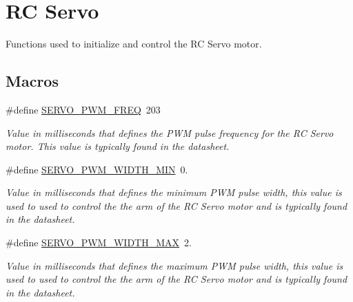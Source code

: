 \hypertarget{group__rc__servo}{\section{R\-C Servo}
\label{group__rc__servo}
}


Functions used to initialize and control the R\-C Servo motor.  


\subsection*{Macros}
\begin{DoxyCompactItemize}
\item 
\hypertarget{group__rc__servo_ga0eb250599505bd3600d26b6bad6a415f}{\#define \hyperlink{group__rc__servo_ga0eb250599505bd3600d26b6bad6a415f}{S\-E\-R\-V\-O\-\_\-\-P\-W\-M\-\_\-\-F\-R\-E\-Q}~203}\label{group__rc__servo_ga0eb250599505bd3600d26b6bad6a415f}

\begin{DoxyCompactList}\small\item\em Value in milliseconds that defines the P\-W\-M pulse frequency for the R\-C Servo motor. This value is typically found in the datasheet. \end{DoxyCompactList}\item 
\hypertarget{group__rc__servo_ga95ba539b3e71a70655a714c95eb046c0}{\#define \hyperlink{group__rc__servo_ga95ba539b3e71a70655a714c95eb046c0}{S\-E\-R\-V\-O\-\_\-\-P\-W\-M\-\_\-\-W\-I\-D\-T\-H\-\_\-\-M\-I\-N}~0.}\label{group__rc__servo_ga95ba539b3e71a70655a714c95eb046c0}

\begin{DoxyCompactList}\small\item\em Value in milliseconds that defines the minimum P\-W\-M pulse width, this value is used to used to control the the arm of the R\-C Servo motor and is typically found in the datasheet. \end{DoxyCompactList}\item 
\hypertarget{group__rc__servo_ga547c363d5ea2c04b34b9ed60a1e9325f}{\#define \hyperlink{group__rc__servo_ga547c363d5ea2c04b34b9ed60a1e9325f}{S\-E\-R\-V\-O\-\_\-\-P\-W\-M\-\_\-\-W\-I\-D\-T\-H\-\_\-\-M\-A\-X}~2.}\label{group__rc__servo_ga547c363d5ea2c04b34b9ed60a1e9325f}

\begin{DoxyCompactList}\small\item\em Value in milliseconds that defines the maximum P\-W\-M pulse width, this value is used to used to control the the arm of the R\-C Servo motor and is typically found in the datasheet. \end{DoxyCompactList}\end{DoxyCompactItemize}
